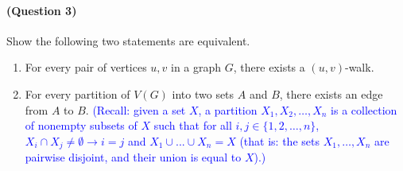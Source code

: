 \documentclass[12 pt]{article}
\begin{document}
\paragraph{(Question 3)} Show the following two statements are equivalent.
\begin{enumerate}
    \item For every pair of vertices $u,v$ in a graph $G$, there exists a $(u,v)$-walk.
    \item For every partition of $V(G)$ into two sets $A$ and $B$, there exists an edge from $A$ to $B$.  \textcolor{blue}{(Recall: given a set $X$, a partition $X_1, X_2, \dots, X_n$ is a collection of nonempty subsets of $X$ such that for all $i,j \in \{1, 2, \dots, n\}$, $X_i \cap X_j \neq \emptyset \rightarrow i = j$ and $X_1 \cup ...\cup X_n = X$ (that is: the sets $X_1, \dots, X_n$ are pairwise disjoint, and their union is equal to $X$).) }
\end{enumerate}
\end{document}
